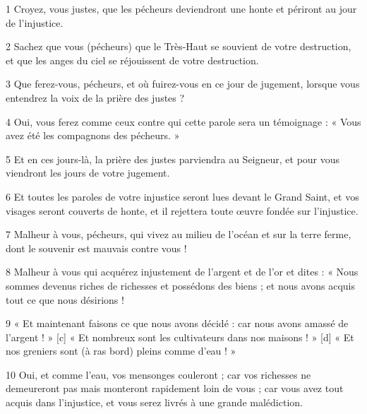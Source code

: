 
\par 1 Croyez, vous justes, que les pécheurs deviendront une honte et périront au jour de l'injustice.
\par 2 Sachez que vous (pécheurs) que le Très-Haut se souvient de votre destruction, et que les anges du ciel se réjouissent de votre destruction.
\par 3 Que ferez-vous, pécheurs, et où fuirez-vous en ce jour de jugement, lorsque vous entendrez la voix de la prière des justes ?
\par 4 Oui, vous ferez comme ceux contre qui cette parole sera un témoignage : « Vous avez été les compagnons des pécheurs. »
\par 5 Et en ces jours-là, la prière des justes parviendra au Seigneur, et pour vous viendront les jours de votre jugement.
\par 6 Et toutes les paroles de votre injustice seront lues devant le Grand Saint, et vos visages seront couverts de honte, et il rejettera toute œuvre fondée sur l'injustice.
\par 7 Malheur à vous, pécheurs, qui vivez au milieu de l'océan et sur la terre ferme, dont le souvenir est mauvais contre vous !
\par 8 Malheur à vous qui acquérez injustement de l'argent et de l'or et dites : « Nous sommes devenus riches de richesses et possédons des biens ; et nous avons acquis tout ce que nous désirions !
\par 9 « Et maintenant faisons ce que nous avons décidé : car nous avons amassé de l'argent ! » [c] « Et nombreux sont les cultivateurs dans nos maisons ! » [d] « Et nos greniers sont (à ras bord) pleins comme d'eau ! »
\par 10 Oui, et comme l'eau, vos mensonges couleront ; car vos richesses ne demeureront pas mais monteront rapidement loin de vous ; car vous avez tout acquis dans l'injustice, et vous serez livrés à une grande malédiction.



